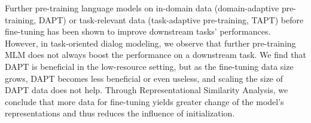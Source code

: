 Further pre-training language models on in-domain data (domain-adaptive pre-training, DAPT) or task-relevant data (task-adaptive pre-training, TAPT) before fine-tuning has been shown to improve downstream tasks' performances. However, in task-oriented dialog modeling, we observe that further pre-training MLM does not always boost the performance on a downstream task. We find that DAPT is beneficial in the low-resource setting, but as the fine-tuning data size grows, DAPT becomes less beneficial or even useless, and scaling the size of DAPT data does not help. Through Representational Similarity Analysis, we conclude that more data for fine-tuning yields greater change of the model's representations and thus reduces the influence of initialization.
